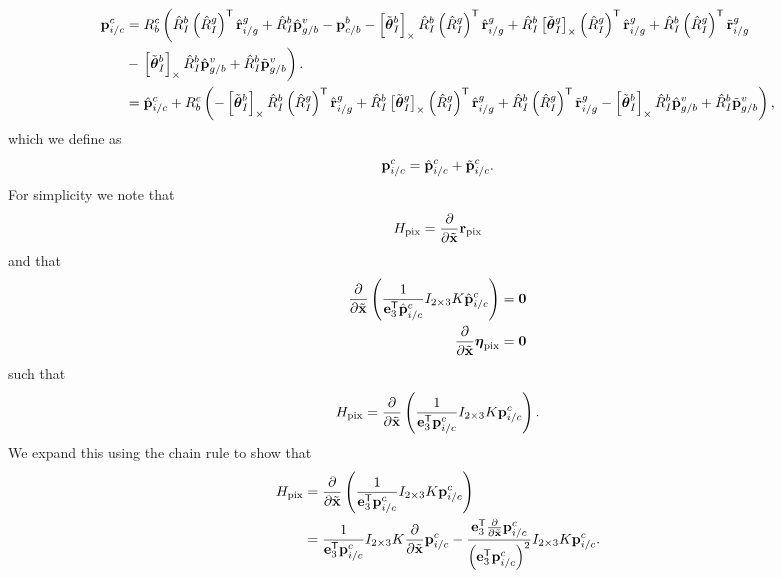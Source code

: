 \begin{align*}
  \boldsymbol{\mathrm{p}}_{i/c}^c &= R_b^c \left( \hat{R}_I^b \left( \hat{R}_I^g \right)^{\mathsf{T}}
  \hat{\boldsymbol{\mathrm{r}}}_{i/g}^g + \hat{R}_I^b \hat{\boldsymbol{\mathrm{p}}}_{g/b}^v - \boldsymbol{\mathrm{p}}_{c/b}^b
  - \left[ \tilde{\boldsymbol{\mathrm{\theta}}}_I^b \right]_{\times} \hat{R}_I^b \left( \hat{R}_I^g
    \right)^{\mathsf{T}} \hat{\boldsymbol{\mathrm{r}}}_{i/g}^g + \hat{R}_I^b
    \left[ \tilde{\boldsymbol{\mathrm{\theta}}}_I^g \right]_{\times} \left( \hat{R}_I^g
  \right)^{\mathsf{T}} \hat{\boldsymbol{\mathrm{r}}}_{i/g}^g +
\hat{R}_I^b \left( \hat{R}_I^g
    \right)^{\mathsf{T}} \tilde{\boldsymbol{\mathrm{r}}}_{i/g}^g \right. \\
                   &- \left. \left[ \tilde{\boldsymbol{\mathrm{\theta}}}_I^b \right]_{\times} \hat{R}_I^b \hat{\boldsymbol{\mathrm{p}}}_{g/b}^v
    + \hat{R}_I^b \tilde{\boldsymbol{\mathrm{p}}}_{g/b}^v
   \right). \\
    &= \hat{\boldsymbol{\mathrm{p}}}_{i/c}^c
    + R_b^c \left( 
  - \left[ \tilde{\boldsymbol{\mathrm{\theta}}}_I^b \right]_{\times} \hat{R}_I^b \left( \hat{R}_I^g
    \right)^{\mathsf{T}} \hat{\boldsymbol{\mathrm{r}}}_{i/g}^g + \hat{R}_I^b
    \left[ \tilde{\boldsymbol{\mathrm{\theta}}}_I^g \right]_{\times} \left( \hat{R}_I^g
  \right)^{\mathsf{T}} \hat{\boldsymbol{\mathrm{r}}}_{i/g}^g +
\hat{R}_I^b \left( \hat{R}_I^g
    \right)^{\mathsf{T}} \tilde{\boldsymbol{\mathrm{r}}}_{i/g}^g
                   - \left[ \tilde{\boldsymbol{\mathrm{\theta}}}_I^b \right]_{\times} \hat{R}_I^b \hat{\boldsymbol{\mathrm{p}}}_{g/b}^v
    + \hat{R}_I^b \tilde{\boldsymbol{\mathrm{p}}}_{g/b}^v
   \right), 
\end{align*}
which we define as
\begin{equation*}
  \boldsymbol{\mathrm{p}}_{i/c}^c = \hat{\boldsymbol{\mathrm{p}}}_{i/c}^c + \tilde{\boldsymbol{\mathrm{p}}}_{i/c}^c .
\end{equation*}
For simplicity we note that 
\begin{equation}
  H_{\text{pix}} = \frac{\partial}{\partial \tilde{\boldsymbol{\mathrm{x}}}} \boldsymbol{\mathrm{r}}_{\text{pix}}
\end{equation}
and that
\begin{align*}
  \frac{\partial}{\partial \tilde{\boldsymbol{\mathrm{x}}}} \left( \frac{1}{\boldsymbol{\mathrm{e}}_3^{\mathsf{T}} \hat{\boldsymbol{\mathrm{p}}}_{i/c}^c} I_{2 \times 3} K
  \hat{\boldsymbol{\mathrm{p}}}_{i/c}^c \right) &= \boldsymbol{\mathrm{0}}
\\
  \frac{\partial}{\partial \tilde{\boldsymbol{\mathrm{x}}}} \boldsymbol{\mathrm{\eta}}_{\text{pix}} &= \boldsymbol{\mathrm{0}}
\end{align*}
such that
\begin{equation}
  H_{\text{pix}} = \frac{\partial}{\partial \tilde{\boldsymbol{\mathrm{x}}}}
 \left( \frac{1}{\boldsymbol{\mathrm{e}}_3^{\mathsf{T}} \boldsymbol{\mathrm{p}}_{i/c}^c} I_{2 \times 3} K
 \boldsymbol{\mathrm{p}}_{i/c}^c \right).
\end{equation}
We expand this using the chain rule to show that
\begin{align}
  H_{\text{pix}} &= \frac{\partial}{\partial \tilde{\boldsymbol{\mathrm{x}}}}
 \left( \frac{1}{\boldsymbol{\mathrm{e}}_3^{\mathsf{T}} \boldsymbol{\mathrm{p}}_{i/c}^c} I_{2 \times 3} K
 \boldsymbol{\mathrm{p}}_{i/c}^c \right) \\
  &= 
 \frac{1}{\boldsymbol{\mathrm{e}}_3^{\mathsf{T}} \boldsymbol{\mathrm{p}}_{i/c}^c} I_{2 \times 3} K
 \frac{\partial}{\partial \tilde{\boldsymbol{\mathrm{x}}}} \boldsymbol{\mathrm{p}}_{i/c}^c 
 - \frac{\boldsymbol{\mathrm{e}}_3^{\mathsf{T}} \frac{\partial}{\partial \tilde{\boldsymbol{\mathrm{x}}}} 
 \boldsymbol{\mathrm{p}}_{i/c}^c}{\left( \boldsymbol{\mathrm{e}}_3^{\mathsf{T}}
 \boldsymbol{\mathrm{p}}_{i/c}^c \right)^2 } I_{2 \times 3} K
  \boldsymbol{\mathrm{p}}_{i/c}^c. 
  \label{eq:H_pix_expanded}
\end{align}
